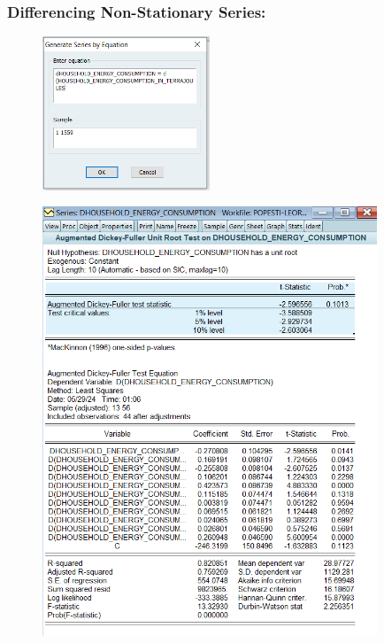 \documentclass{article} %
\begin{document}
\subsubsection*{Differencing Non-Stationary Series:}

\begin{figure}[H]
    \centering
    \includegraphics[width=5cm]{images/image6.png}
\end{figure}

\begin{figure}[H]
    \centering
    \includegraphics[width=10cm]{images/image14.png}
\end{figure}
\end{document}
